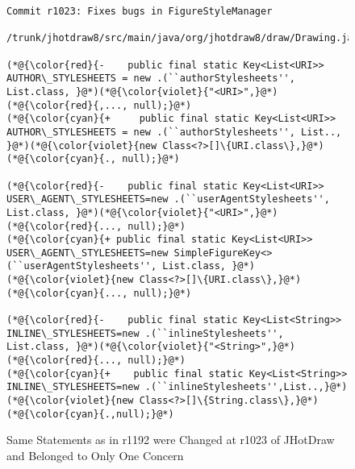 \begin{figure}[t]
	\centering
	\begin{lstlisting}[]
  Commit r1023: Fixes bugs in FigureStyleManager
  /trunk/jhotdraw8/src/main/java/org/jhotdraw8/draw/Drawing.java
   
(*@{\color{red}{-    public final static Key<List<URI>> AUTHOR\_STYLESHEETS = new .(``authorStylesheets'', List.class, }@*)(*@{\color{violet}{"<URI>",}@*)(*@{\color{red}{,..., null);}@*)
(*@{\color{cyan}{+     public final static Key<List<URI>> AUTHOR\_STYLESHEETS = new .(``authorStylesheets'', List.., }@*)(*@{\color{violet}{new Class<?>[]\{URI.class\},}@*)(*@{\color{cyan}{., null);}@*)

(*@{\color{red}{-    public final static Key<List<URI>> USER\_AGENT\_STYLESHEETS=new .(``userAgentStylesheets'', List.class, }@*)(*@{\color{violet}{"<URI>",}@*)(*@{\color{red}{..., null);}@*)
(*@{\color{cyan}{+ public final static Key<List<URI>> USER\_AGENT\_STYLESHEETS=new SimpleFigureKey<> (``userAgentStylesheets'', List.class, }@*)(*@{\color{violet}{new Class<?>[]\{URI.class\},}@*)(*@{\color{cyan}{..., null);}@*)

(*@{\color{red}{-    public final static Key<List<String>> INLINE\_STYLESHEETS=new .(``inlineStylesheets'', List.class, }@*)(*@{\color{violet}{"<String>",}@*)(*@{\color{red}{..., null);}@*)
(*@{\color{cyan}{+    public final static Key<List<String>> INLINE\_STYLESHEETS=new .(``inlineStylesheets'',List..,}@*)(*@{\color{violet}{new Class<?>[]\{String.class\},}@*)(*@{\color{cyan}{.,null);}@*)
	\end{lstlisting}
        \vspace{-15pt}
        \caption{Same Statements as in r1192 were Changed at r1023 of JHotDraw and Belonged to Only One Concern}
        \vspace{-6pt}
        \label{fig:history}
\end{figure}
